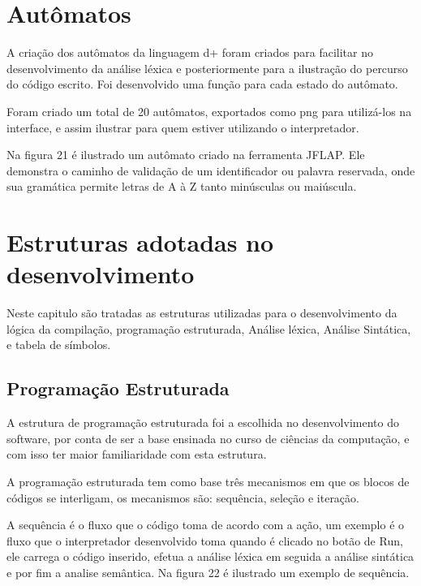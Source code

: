 \documentclass[12pt,oneside,a4paper,chapter=TITLE,section=TITLE,sumario=tradicional]{abntex2}
\begin{document}
\section{Autômatos}
\label{sec:automatosmet}

A criação dos autômatos da linguagem d+ foram criados para facilitar no desenvolvimento da análise léxica e posteriormente para a ilustração do percurso do código escrito. Foi desenvolvido uma função para cada estado do autômato.

Foram criado um total de 20 autômatos, exportados como png para utilizá-los na interface, e assim ilustrar para quem estiver utilizando o interpretador.

Na figura 21 é ilustrado um autômato criado na ferramenta JFLAP. Ele demonstra o caminho de validação de um identificador ou palavra reservada, onde sua gramática permite letras de A à Z tanto minúsculas ou maiúscula.

\begin{figure}[htb]
\end{figure}

\section{Estruturas adotadas no desenvolvimento}
\label{sec:estruturasadotadas}

Neste capitulo são tratadas as estruturas utilizadas para o desenvolvimento da lógica da compilação, programação estruturada, Análise léxica, Análise Sintática, e tabela de símbolos.

\subsection{Programação Estruturada}
\label{subsec:programacaoestruturada}

A estrutura de programação estruturada foi a escolhida no desenvolvimento do software, por conta de ser a base ensinada no curso de ciências da computação, e com isso ter maior familiaridade com esta estrutura.

A programação estruturada tem como base três mecanismos em que os blocos de códigos se interligam, os mecanismos são: sequência, seleção e iteração\cite{ivan2003}.

A sequência é o fluxo que o código toma de acordo com a ação\cite{ivan2003}, um exemplo é o fluxo que o interpretador desenvolvido toma quando é clicado no botão de Run, ele carrega o código inserido, efetua a análise léxica em seguida a análise sintática e por fim a analise semântica. Na figura 22 é ilustrado um exemplo de sequência.
\end{document}
